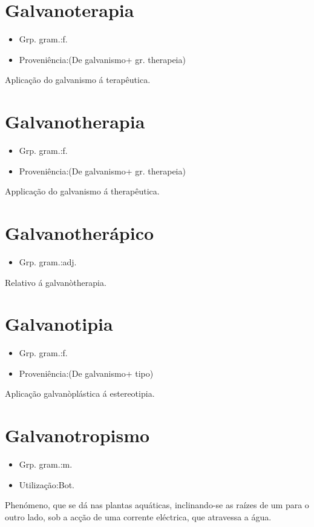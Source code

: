 \section{Galvanoterapia}
\begin{itemize}
\item {Grp. gram.:f.}
\end{itemize}
\begin{itemize}
\item {Proveniência:(De \textunderscore galvanismo\textunderscore  + gr. \textunderscore therapeia\textunderscore )}
\end{itemize}
Aplicação do galvanismo á terapêutica.
\section{Galvanotherapia}
\begin{itemize}
\item {Grp. gram.:f.}
\end{itemize}
\begin{itemize}
\item {Proveniência:(De \textunderscore galvanismo\textunderscore  + gr. \textunderscore therapeia\textunderscore )}
\end{itemize}
Applicação do galvanismo á therapêutica.
\section{Galvanotherápico}
\begin{itemize}
\item {Grp. gram.:adj.}
\end{itemize}
Relativo á galvanòtherapia.
\section{Galvanotipia}
\begin{itemize}
\item {Grp. gram.:f.}
\end{itemize}
\begin{itemize}
\item {Proveniência:(De \textunderscore galvanismo\textunderscore  + \textunderscore tipo\textunderscore )}
\end{itemize}
Aplicação galvanòplástica á estereotipia.
\section{Galvanotropismo}
\begin{itemize}
\item {Grp. gram.:m.}
\end{itemize}
\begin{itemize}
\item {Utilização:Bot.}
\end{itemize}
Phenómeno, que se dá nas plantas aquáticas, inclinando-se as raízes de um para o outro lado, sob a acção de uma corrente eléctrica, que atravessa a água.
